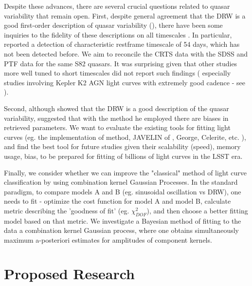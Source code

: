 \documentclass[modern]{aastex62}
\begin{document}
Despite these advances, there are several crucial questions related to quasar variability that remain open. First, despite general agreement that the DRW is a good first-order description of quasar variability (\cite{zu2011,kozlowski2010}), there have been some inquiries to the fidelity of these descriptions on all timescales \cite{zu2013, kasliwal2017, sartori2018}. In particular, \cite{graham2014} reported  a detection of characteristic restframe timescale of 54 days, which has not been detected before.  We  aim to reconcile the CRTS data with the SDSS and PTF data for the same S82 quasars. It was surprising given that other studies more well tuned to short timescales did not report such findings ( especially studies involving Kepler K2  AGN light curves with extremely good cadence - see \cite{kasliwal2015a, aranzana2018, smith2018}).

Second, although \cite{kelly2011} showed that the DRW is a good description of the quasar variability, \cite{kozlowski2017a} suggested that with the method he employed there are biases in retrieved parameters. We want to evaluate the existing tools for fitting light curves (eg. the implementation of \cite{rybicki1995} method, JAVELIN of \cite{zu2011}, George, Celerite, etc. ), and find the best tool for future studies given their scalability (speed), memory usage, bias, to be prepared for fitting of billions of light curves in the LSST era. 

Finally, we consider whether we can improve the "classical" method of light curve classification by using combination kernel Gaussian Processes. In the standard paradigm,  to compare models A and B (eg. sinusoidal oscillation vs DRW), one needs to fit  - optimize the cost function for model A and model B,  calculate metric describing the 'goodness of fit' (eg. $\chi^{2}_{DOF}$), and then choose a better fitting model based on that metric. We investigate a Bayesian method of fitting to the data a combination kernel Gaussian process, where one obtains simultaneously maximum a-posteriori estimates for  amplitudes of component kernels. 

\section{Proposed Research}
\end{document}
